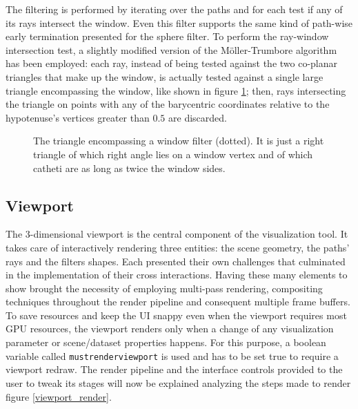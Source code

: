 The filtering is performed by iterating over the paths and for each test if any of its rays intersect the window. Even this filter supports the same kind of path-wise early termination presented for the sphere filter. To perform the ray-window intersection test, a slightly modified version of the M\"oller-Trumbore algorithm \cite{moller1997fast} has been employed: each ray, instead of being tested  against the two co-planar triangles that make up the window, is actually tested against a single large triangle encompassing the window, like shown in figure \ref{encompassing_triangle}; then, rays intersecting the triangle on points with any of the barycentric coordinates relative to the hypotenuse's vertices greater than $0.5$ are discarded.
\begin{figure}
	\centering

	\caption{The triangle encompassing a window filter (dotted). It is just a right triangle of which right angle lies on a window vertex and of which catheti are as long as twice the window sides.}
	\label{encompassing_triangle}
\end{figure}	


\subsection{Viewport}
The 3-dimensional viewport is the central component of the visualization tool. It takes care of interactively rendering three entities: the scene geometry, the paths' rays and the filters shapes. Each presented their own challenges that culminated in the implementation of their cross interactions. Having these many elements to show brought the necessity of employing multi-pass rendering, compositing techniques throughout the render pipeline and consequent multiple frame buffers. To save resources and keep the UI snappy even when the viewport requires most GPU resources, the viewport renders only when a change of any visualization parameter or scene/dataset properties happens. For this purpose, a boolean variable called \texttt{mustrenderviewport} is used and has to be set true to require a viewport redraw. The render pipeline and the interface controls provided to the user to tweak its stages will now be explained analyzing the steps made to render figure \ref{viewport_render}.

